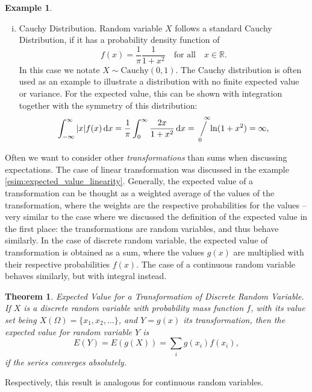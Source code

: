 \documentclass[12pt,a4paper,leqno]{report}
\newcommand{\R}{\mathbb{R}}
\newcommand{\dif}{\,\mathrm{d}}
\newcommand{\sijoitus}[2]{\mathop{\Big/}\limits_{\hspace{-0.85em}{#1}}^{\hspace{0.85em}{#2}}\hspace{-0.2em}}
\theoremstyle{plain}
\newtheorem{lause}[equation]{Theorem}
\theoremstyle{definition}
\newtheorem{esim}[equation]{Example}
\begin{document}
\begin{esim}
\begin{enumerate}[(i)]
\item Cauchy Distribution. Random variable $X$ follows a standard Cauchy Distribution, if it has a probability density function of 
\[
f(x) = \frac{1}{\pi} \frac{1}{1 + x^2}\quad \text{for all} \quad x \in \R.
\]
In this case we notate $X\sim \text{Cauchy}(0,1)$. The Cauchy distribution is often used as an example to illustrate a distribution with no finite expected value or variance. For the expected value, this can be shown with integration together with the symmetry of this distribution:
\[
\int_{-\infty}^\infty |x| f(x) \dif x = \frac{1}{\pi} \int_0^\infty \frac{2x}{1+ x^2} \dif x = \sijoitus{0}{\infty} \ln (1 + x^2) = \infty,
\]
\end{enumerate}
\end{esim}

Often we want to consider other \emph{transformations} than sums when discussing expectations. The case of linear transformation was discussed in the example \ref{esim:expected_value_linearity}. Generally, the expected value of a transformation can be thought as a weighted average of the values of the transformation, where the weights are the respective probabilities for the values -- very similar to the case where we discussed the definition of the expected value in the first place: the transformations are random variables, and thus behave similarly. In the case of discrete random variable, the expected value of transformation is obtained as a sum, where the values $g(x)$ are multiplied with their respective probabilities $f(x)$. The case of a continuous random variable behaves similarly, but with integral instead.

\begin{lause}\label{lause:discr_trans_expectation}
Expected Value for a Transformation of Discrete Random Variable.  If $X$ is a discrete random variable with probability mass function $f$, with its value set being $X(\Omega) = \{x_1, x_2, \dots\}$, and $Y = g(x)$ its transformation, then the expected value for random variable $Y$ is
\[
E(Y) = E(g(X)) = \sum_ig(x_i)f(x_i),
\]
if the series converges absolutely. 
\end{lause}

Respectively, this result is analogous for continuous random variables.
\end{document}
